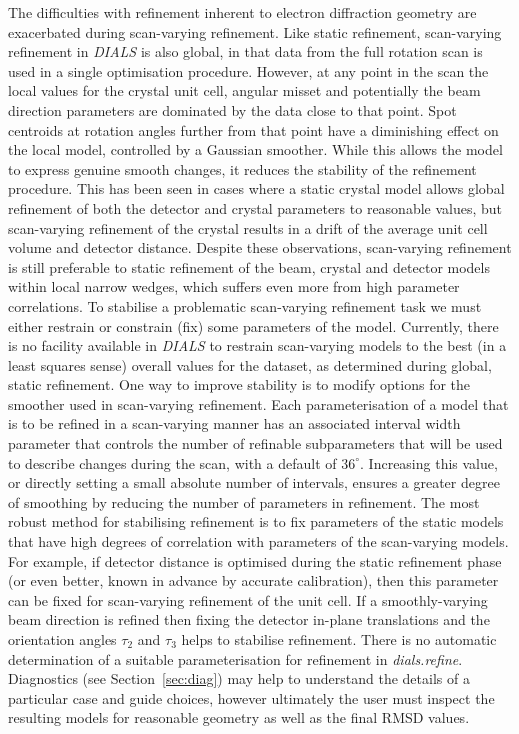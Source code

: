 \documentclass[preprint]{iucr}
\newcommand{\dials}{\emph{DIALS}\xspace}
\newcommand{\dialsrefine}{\emph{dials.refine}\xspace}
\begin{document}
The difficulties with refinement inherent to electron diffraction geometry are
exacerbated during scan-varying refinement. Like static
refinement, scan-varying refinement in \dials is also global, in that data from
the full rotation scan is used in a single optimisation procedure. However, at
any point in the scan the local values for the crystal unit cell, angular
misset and potentially the beam direction parameters are dominated by the data
close to that point. Spot centroids
at rotation angles further from that point have a diminishing effect on the
local model, controlled by a Gaussian smoother. While this allows the
model to express genuine smooth changes,
it reduces the stability of the refinement procedure. This has been seen in
cases where a static crystal model allows global refinement of both the
detector and crystal parameters to reasonable values, but scan-varying
refinement of the crystal results in a drift of the average unit cell volume
and detector distance. Despite these observations, scan-varying refinement is
still preferable to static refinement of the beam, crystal and detector models
within local narrow wedges, which suffers even more from high parameter
correlations. To stabilise a problematic scan-varying refinement task we must
either restrain or constrain (fix) some parameters of the model. Currently,
there is no facility available in \dials to restrain scan-varying models to
the best (in a least squares sense) overall values for the dataset,
as determined during global, static refinement. One way to improve stability
is to modify options for the smoother used in scan-varying
refinement. Each parameterisation of a model that is to be refined in a
scan-varying manner has an associated interval width
parameter that controls the number of refinable subparameters that will be used
to describe changes during the scan, with a default of $36^\circ$.
Increasing this value, or directly setting a small absolute number of
intervals, ensures a greater degree of smoothing by reducing the number of
parameters in refinement. The most robust method for stabilising refinement
is to fix parameters of the static models that have high degrees of correlation
with parameters of the scan-varying models. For example, if detector distance
is optimised during the static refinement phase (or even better, known in
advance by accurate calibration), then this parameter can be fixed for
scan-varying refinement of the unit cell. If a smoothly-varying beam direction
is refined then fixing the detector in-plane translations and the orientation
angles $\tau_2$ and $\tau_3$ helps to stabilise refinement. There is no
automatic determination of a suitable parameterisation for refinement in
\dialsrefine. Diagnostics (see Section~\ref{sec:diag}) may help to understand
the details of a particular case and guide choices, however ultimately the user
must inspect the resulting models for reasonable geometry as well as the final
RMSD values.
\end{document}

